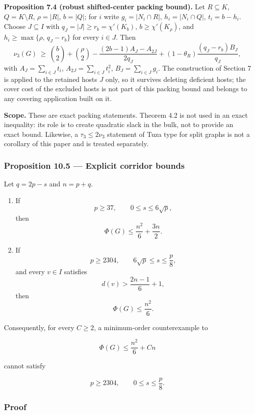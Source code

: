 \documentclass[english,11pt,a4paper]{article}
\begin{document}
\textbf{Proposition 7.4 (robust shifted-center packing bound).} Let
\(R\subseteq K\), \(Q=K\setminus R\), \(\rho=|R|\), \(b=|Q|\); for \(i\)
write \(g_i=|N_i\cap R|\), \(h_i=|N_i\cap Q|\), \(t_i=b-h_i\). Choose
\(J\subseteq I\) with \(q_J=|J|\ge r_b=\chi'(K_b)\),
\(b\ge\chi'(K_\rho)\), and \(h_i\ge\max\{\rho,\,q_J-r_b\}\) for every
\(i\in J\). Then \[
\nu_3(G)\ \ge\ \binom b2+\binom\rho2-\frac{(2b-1)A_J-A_{2J}}{2q_J}+(1-\theta_R)\frac{(q_J-r_b)B_J}{q_J},
\] with \(A_J=\sum_{i\in J}t_i\), \(A_{2J}=\sum_{i\in J}t_i^2\),
\(B_J=\sum_{i\in J}g_i\). The construction of Section 7 is applied to
the retained hosts \(J\) only, so it survives deleting deficient hosts;
the cover cost of the excluded hosts is not part of this packing bound
and belongs to any covering application built on it.

\textbf{Scope.} These are exact packing statements. Theorem 4.2 is not
used in an exact inequality: its role is to create quadratic slack in
the bulk, not to provide an exact bound. Likewise, a \(\tau_3\le2\nu_3\)
statement of Tuza type for split graphs is not a corollary of this paper
and is treated separately.

\subsubsection{Proposition 10.5 --- Explicit corridor
bounds}\label{proposition-10.5-explicit-corridor-bounds}

Let \(q=2p-s\) and \(n=p+q\).

\begin{enumerate}
\def\labelenumi{\arabic{enumi}.}
\item
  If \[
  p\ge37,
  \qquad
  0\le s\le6\sqrt p,
  \] then \[
  \boxed{
  \Phi(G)\le\frac{n^2}{6}+\frac{3n}{2}
  }.
  \tag{10.2}
  \]
\item
  If \[
  p\ge2304,
  \qquad
  6\sqrt p\le s\le\frac p8,
  \] and every \(v\in I\) satisfies \[
  d(v)>\frac{2n-1}{6}+1,
  \] then \[
  \boxed{
  \Phi(G)\le\frac{n^2}{6}
  }.
  \tag{10.3}
  \]
\end{enumerate}

Consequently, for every \(C\ge2\), a minimum-order counterexample to

\[
\Phi(G)\le\frac{n^2}{6}+Cn
\]

cannot satisfy

\[
p\ge2304,
\qquad
0\le s\le\frac p8.
\]

\subsubsection{Proof}\label{proof-8}
\end{document}
